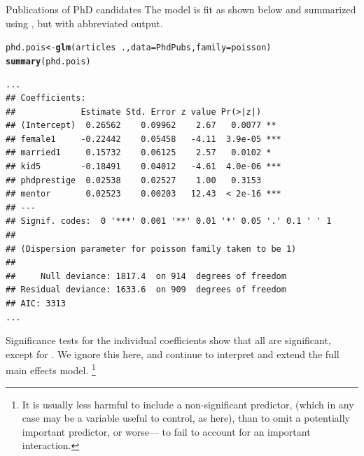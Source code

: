 \documentclass[11pt]{book}\usepackage[]{graphicx}\usepackage[]{color}
\makeatletter
\newcommand{\hlopt}[1]{\textcolor[rgb]{0,0,0}{#1}}%
\newcommand{\hlstd}[1]{\textcolor[rgb]{0.345,0.345,0.345}{#1}}%
\newcommand{\hlkwb}[1]{\textcolor[rgb]{0.69,0.353,0.396}{#1}}%
\newcommand{\hlkwc}[1]{\textcolor[rgb]{0.333,0.667,0.333}{#1}}%
\newcommand{\hlkwd}[1]{\textcolor[rgb]{0.737,0.353,0.396}{\textbf{#1}}}%
\newenvironment{kframe}{%
 \def\at@end@of@kframe{}%
 \ifinner\ifhmode%
  \def\at@end@of@kframe{\end{minipage}}%
  \begin{minipage}{\columnwidth}%
 \fi\fi%
 \def\FrameCommand##1{\hskip\@totalleftmargin \hskip-\fboxsep
 \colorbox{shadecolor}{##1}\hskip-\fboxsep
     \hskip-\linewidth \hskip-\@totalleftmargin \hskip\columnwidth}%
 \MakeFramed {\advance\hsize-\width
   \@totalleftmargin\z@ \linewidth\hsize
   \@setminipage}}%
 {\par\unskip\endMakeFramed%
 \at@end@of@kframe}
\newenvironment{knitrout}{}{} %
\renewenvironment{knitrout}{\small\renewcommand{\baselinestretch}{.85}}{} %
\makeatother
\begin{document}
\begin{Example}[phdpubs1]{Publications of PhD candidates}
The model is fit as shown below and summarized using , but with abbreviated output.
\begin{knitrout}
\color{fgcolor}\begin{kframe}
\begin{alltt}
\hlstd{phd.pois} \hlkwb{<-} \hlkwd{glm}\hlstd{(articles} \hlopt{~} \hlstd{.,} \hlkwc{data}\hlstd{=PhdPubs,} \hlkwc{family}\hlstd{=poisson)}
\hlkwd{summary}\hlstd{(phd.pois)}
\end{alltt}
\begin{verbatim}
...
## Coefficients:
##             Estimate Std. Error z value Pr(>|z|)    
## (Intercept)  0.26562    0.09962    2.67   0.0077 ** 
## female1     -0.22442    0.05458   -4.11  3.9e-05 ***
## married1     0.15732    0.06125    2.57   0.0102 *  
## kid5        -0.18491    0.04012   -4.61  4.0e-06 ***
## phdprestige  0.02538    0.02527    1.00   0.3153    
## mentor       0.02523    0.00203   12.43  < 2e-16 ***
## ---
## Signif. codes:  0 '***' 0.001 '**' 0.01 '*' 0.05 '.' 0.1 ' ' 1
## 
## (Dispersion parameter for poisson family taken to be 1)
## 
##     Null deviance: 1817.4  on 914  degrees of freedom
## Residual deviance: 1633.6  on 909  degrees of freedom
## AIC: 3313
...
\end{verbatim}
\end{kframe}
\end{knitrout}
Significance tests for the individual coefficients show that all are significant,
except for .  We ignore this here, and continue to interpret and
extend the full main effects model.%
\footnote{
It is usually less harmful to include a non-significant predictor,
(which in any case may be a variable useful to control, as  here), than to omit a
potentially important predictor, or worse--- to fail to account for an important interaction.
}


\end{Example}
\end{document}
